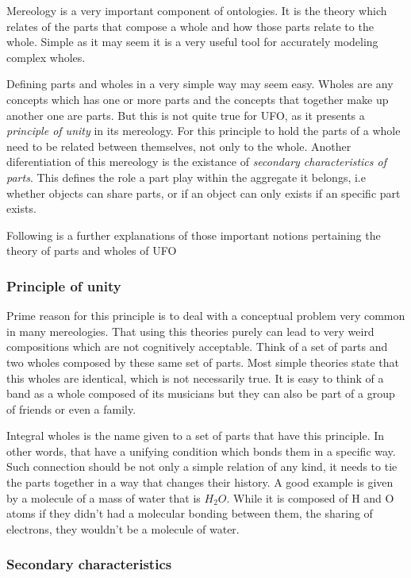 Mereology is a very important component of ontologies. It is the theory which relates of the parts that compose a whole and how those parts relate to the whole. Simple as it may seem it is a very useful tool for accurately modeling complex wholes.

Defining parts and wholes in a very simple way may seem easy. Wholes are any concepts which has one or more parts and the concepts that together make up another one are parts. But this is not quite true for UFO, as it presents a \textit{principle of unity} in its mereology. For this principle to hold the parts of a whole need to be related between themselves, not only to the whole. Another diferentiation of this mereology is the existance of \textit{secondary characteristics of parts}. This defines the role a part play within the aggregate it belongs, i.e whether objects can share parts, or if an object can only exists if an specific part exists. 

Following is a further explanations of those important notions pertaining the theory of parts and wholes of UFO

\subsubsection{Principle of unity}

Prime reason for this principle is to deal with a conceptual problem very common in many mereologies. That using this theories purely can lead to very weird compositions which are not cognitively acceptable. Think of a set of parts and two wholes composed by these same set of parts. Most simple theories state that this wholes are identical, which is not necessarily true. It is easy to think of a band as a whole composed of its musicians but they can also be part of a group of friends or even a family. 

Integral wholes is the name given to a set of parts that have this principle. In other words, that have a unifying condition which bonds them in a specific way. Such connection should be not only a simple relation of any kind, it needs to tie the parts together in a way that changes their history. A good example is given by a molecule of a mass of water that is $H_2O$. While it is composed of H and O atoms if they didn't had a molecular bonding between them, the sharing of electrons, they wouldn't be a molecule of water.

\subsubsection{Secondary characteristics}

